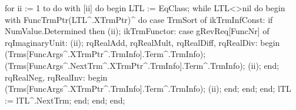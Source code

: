    for ii := 1 to  do
      with [ii] do
   begin
      LTL := EqClass;
      while LTL<>nil do
      begin
         with FuncTrmPtr(LTL^.XTrmPtr)^ do
      case TrmSort of
         ikTrmInfConst:
            if NumValue.Determined then
               (ii);
         ikTrmFunctor:
            case gRevReq[FuncNr] of
               rqImaginaryUnit:
                  (ii);
               rqRealAdd,  rqRealMult, rqRealDiff, rqRealDiv:
                  begin
                     (Trms[FuncArgs^.XTrmPtr^.TrmInfo].Term^.TrmInfo);
                     (Trms[FuncArgs^.NextTrm^.XTrmPtr^.TrmInfo].Term^.TrmInfo);
                     (ii);
                  end;
               rqRealNeg, rqRealInv:
                  begin
                     (Trms[FuncArgs^.XTrmPtr^.TrmInfo].Term^.TrmInfo);
                     (ii);
                  end;
            end;
      end;
         lTL := lTL^.NextTrm;
      end;
   end;
end;

